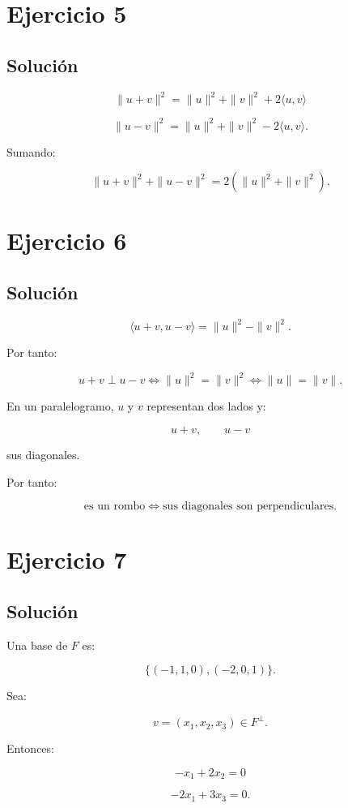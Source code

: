 \documentclass[11pt,a4paper]{article}
\begin{document}
\section{Ejercicio 5}
\subsection{Solución}

\[
\|u+v\|^2
=
\|u\|^2+\|v\|^2+2\langle u,v\rangle
\]

\[
\|u-v\|^2
=
\|u\|^2+\|v\|^2-2\langle u,v\rangle.
\]

Sumando:

\[
\boxed{
\|u+v\|^2+\|u-v\|^2
=
2\left(\|u\|^2+\|v\|^2\right).
}
\]

\section{Ejercicio 6}
\subsection{Solución}

\[
\langle u+v,u-v\rangle
=
\|u\|^2-\|v\|^2.
\]

Por tanto:

\[
u+v\perp u-v
\iff
\|u\|^2=\|v\|^2
\iff
\boxed{\|u\|=\|v\|.}
\]

En un paralelogramo, $u$ y $v$ representan dos lados y:

\[
u+v,
\qquad
u-v
\]

sus diagonales.

Por tanto:

\[
\boxed{
\text{es un rombo}
\iff
\text{sus diagonales son perpendiculares}.
}
\]

\section{Ejercicio 7}
\subsection{Solución}

Una base de $F$ es:

\[
\{(-1,1,0),(-2,0,1)\}.
\]

Sea:

\[
v=(x_1,x_2,x_3)\in F^\perp.
\]

Entonces:

\[
-x_1+2x_2=0
\]

\[
-2x_1+3x_3=0.
\]
\end{document}
